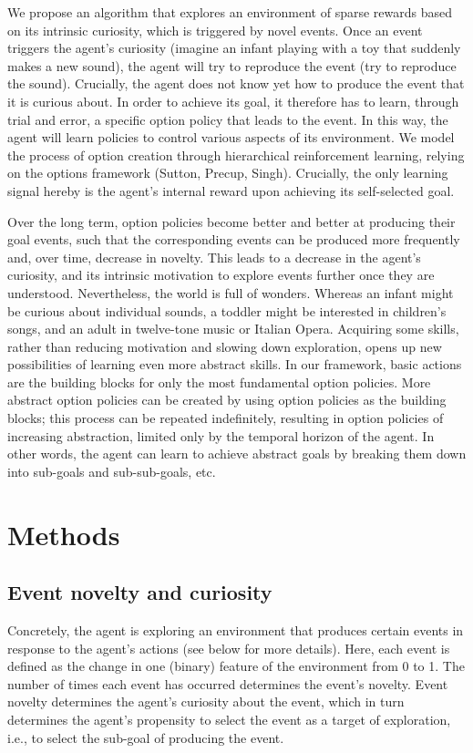 \documentclass{article}
\begin{document}
We propose an algorithm that explores an environment of sparse rewards based on its intrinsic curiosity, which is triggered by novel events. Once an event triggers the agent's curiosity (imagine an infant playing with a toy that suddenly makes a new sound), the agent will try to reproduce the event (try to reproduce the sound). Crucially, the agent does not know yet how to produce the event that it is curious about. In order to achieve its goal, it therefore has to learn, through trial and error, a specific option policy that leads to the event. In this way, the agent will learn policies to control various aspects of its environment. We model the process of option creation through hierarchical reinforcement learning, relying on the options framework (Sutton, Precup, Singh). Crucially, the only learning signal hereby is the agent's internal reward upon achieving its self-selected goal.

Over the long term, option policies become better and better at producing their goal events, such that the corresponding events can be produced more frequently and, over time, decrease in novelty. This leads to a decrease in the agent's curiosity, and its intrinsic motivation to explore events further once they are understood. Nevertheless, the world is full of wonders. Whereas an infant might be curious about individual sounds, a toddler might be interested in children's songs, and an adult in twelve-tone music or Italian Opera. Acquiring some skills, rather than reducing motivation and slowing down exploration, opens up new possibilities of learning even more abstract skills. In our framework, basic actions are the building blocks for only the most fundamental option policies. More abstract option policies can be created by using option policies as the building blocks; this process can be repeated indefinitely, resulting in option policies of increasing abstraction, limited only by the temporal horizon of the agent. In other words, the agent can learn to achieve abstract goals by breaking them down into sub-goals and sub-sub-goals, etc.


\section{Methods}

\subsection{Event novelty and curiosity}

Concretely, the agent is exploring an environment that produces certain events in response to the agent's actions (see below for more details). Here, each event is defined as the change in one (binary) feature of the environment from 0 to 1. The number of times each event has occurred determines the event's novelty. Event novelty determines the agent's curiosity about the event, which in turn determines the agent's propensity to select the event as a target of exploration, i.e., to select the sub-goal of producing the event.
\end{document}
